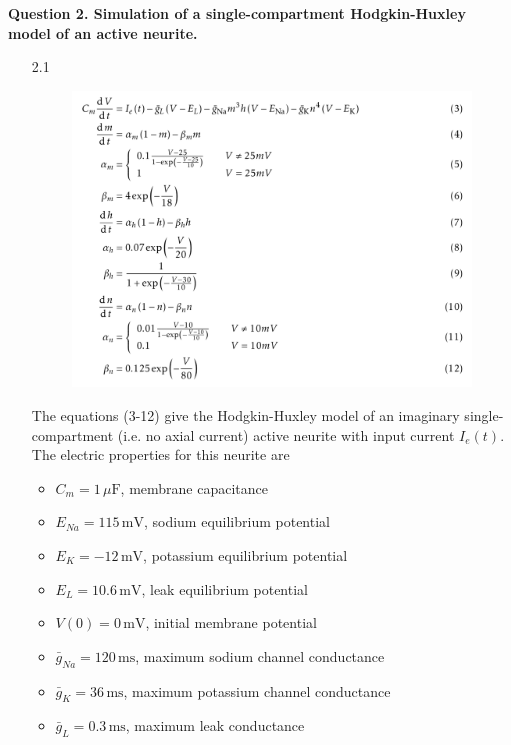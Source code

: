 \documentclass[12pt]{article}
\begin{document}
\noindent\textbf{Question 2. Simulation of a single-compartment Hodgkin-Huxley model of an active neurite.}
    \begin{enumerate}
        \item[2.1]
        \begin{figure}[h]
            \centering
            \includegraphics[width=1\textwidth]{Figures/Eqs.png}
        \end{figure} 
        The equations (3-12) give the Hodgkin-Huxley model of an imaginary single-compartment (i.e. no axial current) active neurite with input current $I_{e}(t)$.
        The electric properties for this neurite are
        \begin{itemize}
            \item $C_{m}=1 \, \mu \text{F}$, membrane capacitance
            \item $E_{Na}=115 \, \text{mV}$, sodium equilibrium potential
            \item $E_{K}=-12 \, \text{mV}$, potassium equilibrium potential
            \item $E_{L}=10.6 \, \text{mV}$, leak equilibrium potential
            \item $V(0)=0 \, \text{mV}$, initial membrane potential
            \item $\bar{g}_{Na}=120 \, \text{ms}$, maximum sodium channel conductance
            \item $\bar{g}_{K}=36 \, \text{ms}$, maximum potassium channel conductance
            \item $\bar{g}_{L}=0.3 \, \text{ms}$, maximum leak conductance
        \end{itemize}

\end{enumerate}
\end{document}
